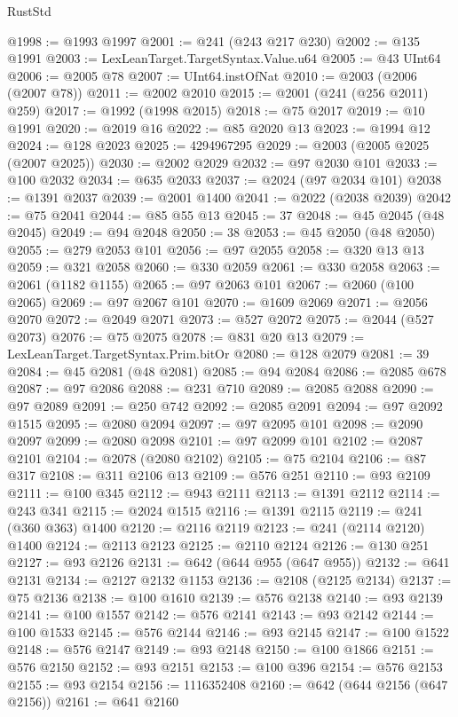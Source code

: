 \begin{lexlean}{RustStd}
\begin{coremodule}
@1998 := @1993 @1997
@2001 := @241 (@243 @217 @230)
@2002 := @135 @1991
@2003 := LexLeanTarget.TargetSyntax.Value.u64
@2005 := @43 UInt64
@2006 := @2005 @78
@2007 := UInt64.instOfNat
@2010 := @2003 (@2006 (@2007 @78))
@2011 := @2002 @2010
@2015 := @2001 (@241 (@256 @2011) @259)
@2017 := @1992 (@1998 @2015)
@2018 := @75 @2017
@2019 := @10 @1991
@2020 := @2019 @16
@2022 := @85 @2020 @13
@2023 := @1994 @12
@2024 := @128 @2023
@2025 := 4294967295
@2029 := @2003 (@2005 @2025 (@2007 @2025))
@2030 := @2002 @2029
@2032 := @97 @2030 @101
@2033 := @100 @2032
@2034 := @635 @2033
@2037 := @2024 (@97 @2034 @101)
@2038 := @1391 @2037
@2039 := @2001 @1400
@2041 := @2022 (@2038 @2039)
@2042 := @75 @2041
@2044 := @85 @55 @13
@2045 := 37
@2048 := @45 @2045 (@48 @2045)
@2049 := @94 @2048
@2050 := 38
@2053 := @45 @2050 (@48 @2050)
@2055 := @279 @2053 @101
@2056 := @97 @2055
@2058 := @320 @13 @13
@2059 := @321 @2058
@2060 := @330 @2059
@2061 := @330 @2058
@2063 := @2061 (@1182 @1155)
@2065 := @97 @2063 @101
@2067 := @2060 (@100 @2065)
@2069 := @97 @2067 @101
@2070 := @1609 @2069
@2071 := @2056 @2070
@2072 := @2049 @2071
@2073 := @527 @2072
@2075 := @2044 (@527 @2073)
@2076 := @75 @2075
@2078 := @831 @20 @13
@2079 := LexLeanTarget.TargetSyntax.Prim.bitOr
@2080 := @128 @2079
@2081 := 39
@2084 := @45 @2081 (@48 @2081)
@2085 := @94 @2084
@2086 := @2085 @678
@2087 := @97 @2086
@2088 := @231 @710
@2089 := @2085 @2088
@2090 := @97 @2089
@2091 := @250 @742
@2092 := @2085 @2091
@2094 := @97 @2092 @1515
@2095 := @2080 @2094
@2097 := @97 @2095 @101
@2098 := @2090 @2097
@2099 := @2080 @2098
@2101 := @97 @2099 @101
@2102 := @2087 @2101
@2104 := @2078 (@2080 @2102)
@2105 := @75 @2104
@2106 := @87 @317
@2108 := @311 @2106 @13
@2109 := @576 @251
@2110 := @93 @2109
@2111 := @100 @345
@2112 := @943 @2111
@2113 := @1391 @2112
@2114 := @243 @341
@2115 := @2024 @1515
@2116 := @1391 @2115
@2119 := @241 (@360 @363) @1400
@2120 := @2116 @2119
@2123 := @241 (@2114 @2120) @1400
@2124 := @2113 @2123
@2125 := @2110 @2124
@2126 := @130 @251
@2127 := @93 @2126
@2131 := @642 (@644 @955 (@647 @955))
@2132 := @641 @2131
@2134 := @2127 @2132 @1153
@2136 := @2108 (@2125 @2134)
@2137 := @75 @2136
@2138 := @100 @1610
@2139 := @576 @2138
@2140 := @93 @2139
@2141 := @100 @1557
@2142 := @576 @2141
@2143 := @93 @2142
@2144 := @100 @1533
@2145 := @576 @2144
@2146 := @93 @2145
@2147 := @100 @1522
@2148 := @576 @2147
@2149 := @93 @2148
@2150 := @100 @1866
@2151 := @576 @2150
@2152 := @93 @2151
@2153 := @100 @396
@2154 := @576 @2153
@2155 := @93 @2154
@2156 := 1116352408
@2160 := @642 (@644 @2156 (@647 @2156))
@2161 := @641 @2160

\end{coremodule}
\end{lexlean}
